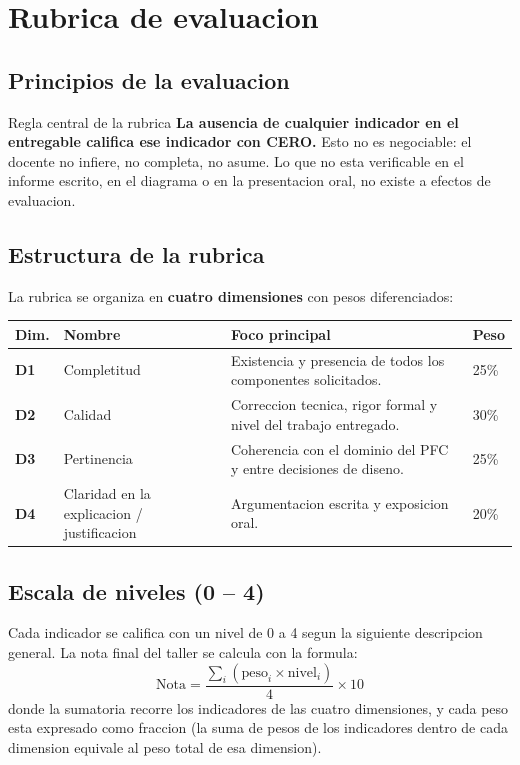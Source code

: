 \documentclass[11pt,a4paper]{article}
\begin{document}
\newpage
\section{Rubrica de evaluacion}
\label{sec:rubrica}

\subsection{Principios de la evaluacion}

\begin{cajacritica}{Regla central de la rubrica}
\textbf{La ausencia de cualquier indicador en el entregable califica ese indicador con CERO.} Esto no es negociable: el docente no infiere, no completa, no asume. Lo que no esta verificable en el informe escrito, en el diagrama o en la presentacion oral, no existe a efectos de evaluacion.
\end{cajacritica}

\subsection{Estructura de la rubrica}

La rubrica se organiza en \textbf{cuatro dimensiones} con pesos diferenciados:

\renewcommand{\arraystretch}{1.25}
\begin{xltabular}{\linewidth}{@{}llXl@{}}
\toprule
\textbf{Dim.} & \textbf{Nombre} & \textbf{Foco principal} & \textbf{Peso} \\
\midrule
\textbf{D1} & Completitud & Existencia y presencia de todos los componentes solicitados. & 25\% \\
\textbf{D2} & Calidad & Correccion tecnica, rigor formal y nivel del trabajo entregado. & 30\% \\
\textbf{D3} & Pertinencia & Coherencia con el dominio del PFC y entre decisiones de diseno. & 25\% \\
\textbf{D4} & Claridad en la explicacion / justificacion & Argumentacion escrita y exposicion oral. & 20\% \\
\bottomrule
\end{xltabular}

\subsection{Escala de niveles (0 -- 4)}

Cada indicador se califica con un nivel de 0 a 4 segun la siguiente descripcion general. La nota final del taller se calcula con la formula:
\[
\text{Nota} = \frac{\sum_{i} (\text{peso}_i \times \text{nivel}_i)}{4} \times 10
\]
donde la sumatoria recorre los indicadores de las cuatro dimensiones, y cada peso esta expresado como fraccion (la suma de pesos de los indicadores dentro de cada dimension equivale al peso total de esa dimension).
\end{document}
